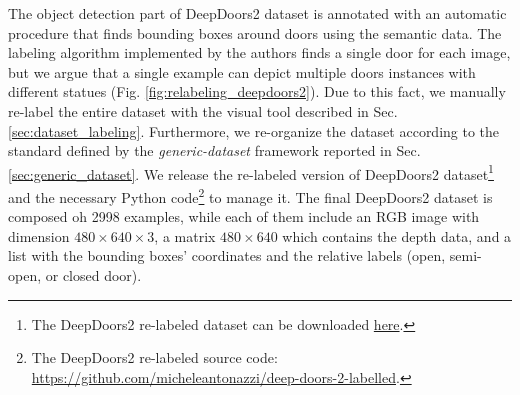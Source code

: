 The object detection part of DeepDoors2 dataset is annotated with an automatic procedure that finds bounding boxes around doors using the semantic data. The labeling algorithm implemented by the authors finds a single door for each image, but we argue that a single example can depict multiple doors instances with different statues (Fig. \ref{fig:relabeling_deepdoors2}). Due to this fact, we manually re-label the entire dataset with the visual tool described in Sec. \ref{sec:dataset_labeling}. Furthermore, we re-organize the dataset according to the standard defined by the \textit{generic-dataset} framework reported in Sec. \ref{sec:generic_dataset}. We release the re-labeled version of DeepDoors2 dataset\footnote{The DeepDoors2 re-labeled dataset can be downloaded \href{https://drive.google.com/file/d/1wSmFUHF9aSJkomwFdOmepMevBvkRpf3D/view?usp=sharing}{here}.} and the necessary Python code\footnote{The DeepDoors2 re-labeled source code: \url{https://github.com/micheleantonazzi/deep-doors-2-labelled}.} to manage it. The final DeepDoors2 dataset is composed oh 2998 examples, while each of them include an RGB image with dimension $480 \times 640 \times 3$, a matrix $480 \times 640$ which contains the depth data, and a list with the bounding boxes' coordinates and the relative labels (open, semi-open, or closed door). 

